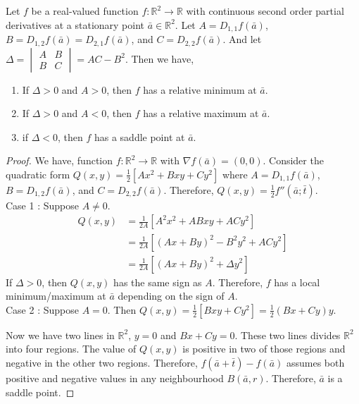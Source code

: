 \begin{theorem}
Let $f$ be a real-valued function $f : \mathbb{R}^2 \to \mathbb{R}$ with continuous second order partial derivatives at a stationary point $\bar{a} \in \mathbb{R}^2$.
Let $A = D_{1,1}f(\bar{a})$, $B = D_{1,2}f(\bar{a}) = D_{2,1}f(\bar{a})$, and $C = D_{2,2}f(\bar{a})$.
And let $\Delta = \begin{vmatrix}A & B \\ B & C \end{vmatrix} = AC - B^2$.
Then we have,
\begin{enumerate}
	\item If $\Delta > 0$ and $A > 0$, then $f$ has a relative minimum at $\bar{a}$.
	\item If $\Delta > 0$ and $A < 0$, then $f$ has a relative maximum at $\bar{a}$.
	\item if $\Delta < 0$, then $f$ has a saddle point at $\bar{a}$.
\end{enumerate}
\end{theorem}
\begin{proof}
	We have, function $f : \mathbb{R}^2 \to \mathbb{R}$ with $\nabla f(\bar{a}) = (0,0)$.
	Consider the quadratic form $Q(x,y) = \frac{1}{2}[Ax^2+Bxy+Cy^2]$ where $A = D_{1,1}f(\bar{a})$, $B = D_{1,2}f(\bar{a})$, and $C = D_{2,2}f(\bar{a})$.
	Therefore, $Q(x,y) = \frac{1}{2}f''(\bar{a};\bar{t})$.\\
	Case 1 : Suppose $A \ne 0$.
	\begin{align*}
		Q(x,y) & = \frac{1}{2A}[A^2x^2+ABxy+ACy^2] \\
		& = \frac{1}{2A}[(Ax+By)^2 - B^2y^2 + ACy^2] \\
		& = \frac{1}{2A}[(Ax+By)^2 + \Delta y^2]
	\end{align*}
	If $\Delta > 0$, then $Q(x,y)$ has the same sign as $A$.
	Therefore, $f$ has a local minimum/maximum at $\bar{a}$ depending on the sign of $A$.\\
	Case 2 : Suppose $A = 0$.
	Then $Q(x,y)  = \frac{1}{2}[Bxy+Cy^2] = \frac{1}{2}(Bx+Cy)y$.

	Now we have two lines in $\mathbb{R}^2$, $y = 0$ and $Bx+Cy = 0$.
	These two lines divides $\mathbb{R}^2$ into four regions.
	The value of $Q(x,y)$ is positive in two of those regions and negative in the other two regions.
	Therefore, $f(\bar{a}+\bar{t})-f(\bar{a})$ assumes both positive and negative values in any neighbourhood $B(\bar{a},r)$.
	Therefore, $\bar{a}$ is a saddle point.
\end{proof}


